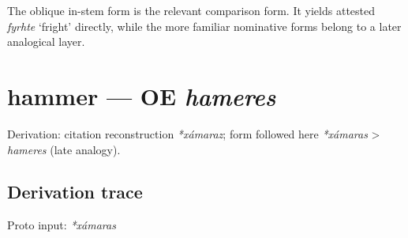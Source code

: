 \documentclass[
  british,
  a4paper,
  openany]{book}
\providecommand{\texorpdfstring}[2]{#1}
\begin{document}
The oblique in-stem form is the relevant comparison form. It yields
attested {\emph{fyrhte}} `fright' directly, while the more familiar
nominative forms belong to a later analogical layer.

\section{\texorpdfstring{hammer --- OE
\emph{hameres}}{hammer --- OE hameres}}\label{hammer-oe-hameres}


Derivation: citation reconstruction \emph{*xámaraz}; form followed here
\emph{*xámaras} \textgreater{} \emph{hameres} (late analogy).

\subsection{Derivation trace}\label{derivation-trace-114}

Proto input: \emph{*xámaras}

\begingroup
\setlength{\fboxsep}{6pt}
\end{document}
